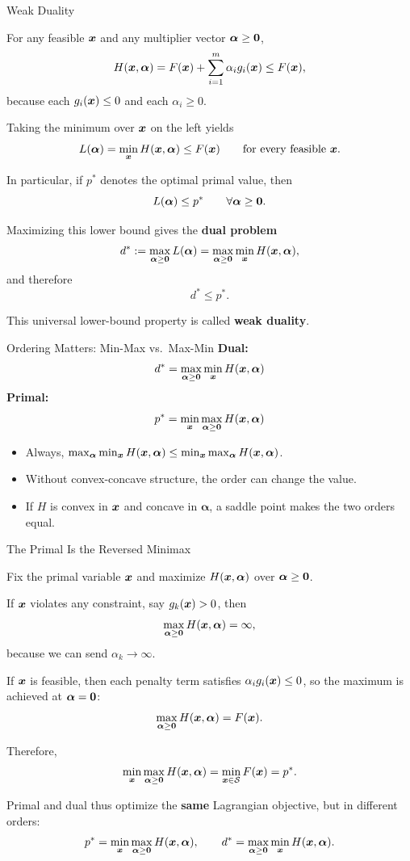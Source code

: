 \documentclass[11pt,compress,t,notes=noshow, xcolor=table]{beamer}
\newcommand{\alphav}{\bm{\alpha}}
\begin{document}
\begin{framei}[fs=small]{Weak Duality}
\item For any feasible $\bm{x}$ and any multiplier vector $\alphav \ge \zero$,
$$
H(\xv,\alphav)
=
F(\xv) + \sum_{i=1}^m \alpha_i g_i(\xv)
\le
F(\xv),
$$
because each $g_i(\bm{x}) \le 0$ and each $\alpha_i \ge 0$.
\item Taking the minimum over $\bm{x}$ on the left yields
$$
L(\alphav) = \min_{\xv} H(\xv,\alphav) \le F(\xv)
\qquad \text{for every feasible } \xv.
$$
\item In particular, if $p^\ast$ denotes the optimal primal value, then
$$
L(\alphav) \le p^\ast
\qquad \forall \alphav \ge \zero.
$$
\item Maximizing this lower bound gives the \textbf{dual problem}
$$
d^\ast
:=
\max_{\alphav \ge \zero} L(\alphav)
=
\max_{\alphav \ge \zero} \min_{\xv} H(\xv,\alphav),
$$
and therefore
$$
d^\ast \le p^\ast.
$$
\item This universal lower-bound property is called \textbf{weak duality}.
\end{framei}


\begin{framev}[fs=scriptsize]{Ordering Matters: Min-Max vs.\ Max-Min}
\textbf{Dual:}
$$
d^\ast = \max_{\alphav \ge \zero} \min_{\xv} H(\xv,\alphav)
$$
\textbf{Primal:}
$$
p^\ast = \min_{\xv} \max_{\alphav \ge \zero} H(\xv,\alphav)
$$
\begin{itemize}
\item Always, $\max_{\alphav} \min_{\xv} H(\xv,\alphav) \le \min_{\xv} \max_{\alphav} H(\xv,\alphav)$.
\item Without convex-concave structure, the order can change the value.
\item If $H$ is convex in $\bm{x}$ and concave in $\alphav$, a saddle point makes the two orders equal.
\end{itemize}
\end{framev}


\begin{framei}[fs=small]{The Primal Is the Reversed Minimax}
\item Fix the primal variable $\bm{x}$ and maximize $H(\xv,\alphav)$ over $\alphav \ge \zero$.
\item If $\bm{x}$ violates any constraint, say $g_k(\bm{x}) > 0$, then
$$
\max_{\alphav \ge \zero} H(\xv,\alphav) = \infty,
$$
because we can send $\alpha_k \rightarrow \infty$.
\item If $\bm{x}$ is feasible, then each penalty term satisfies $\alpha_i g_i(\bm{x}) \le 0$, so the maximum is achieved at $\alphav = \zero$:
$$
\max_{\alphav \ge \zero} H(\xv,\alphav) = F(\xv).
$$
\item Therefore,
$$
\min_{\xv} \max_{\alphav \ge \zero} H(\xv,\alphav)
=
\min_{\xv \in \S} F(\xv)
=
p^\ast.
$$
\item Primal and dual thus optimize the \textbf{same} Lagrangian objective, but in different orders:
$$
p^\ast = \min_{\xv} \max_{\alphav \ge \zero} H(\xv,\alphav),
\qquad
d^\ast = \max_{\alphav \ge \zero} \min_{\xv} H(\xv,\alphav).
$$
\end{framei}
\end{document}
